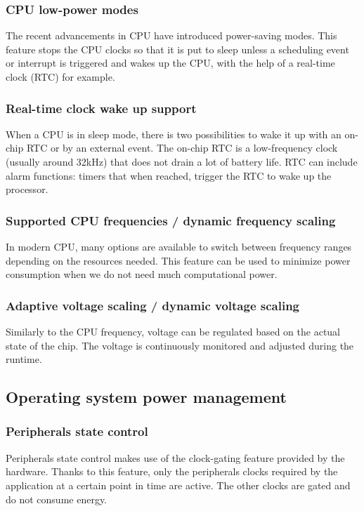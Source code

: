 \subsubsection{CPU low-power modes}
The recent advancements in CPU have introduced power-saving modes.
This feature stops the CPU clocks so that it is put to sleep unless
    a scheduling event or interrupt is triggered and wakes up the CPU, with the help of a real-time clock (RTC) for example.

\subsubsection{Real-time clock wake up support}
When a CPU is in sleep mode, there is two possibilities to wake it up with an on-chip RTC or by an external event.
The on-chip RTC is a low-frequency clock (usually around 32kHz) that does not drain a lot of battery life.
RTC can include alarm functions: timers that when reached, trigger the RTC to wake up the processor.

\subsubsection{Supported CPU frequencies / dynamic frequency scaling}
In modern CPU, many options are available to switch between frequency ranges depending on the resources needed.
This feature can be used to minimize power consumption when  we do not need much computational power.

\subsubsection{Adaptive voltage scaling / dynamic voltage scaling}
Similarly to the CPU frequency, voltage can be regulated based on the actual state of the chip.
The voltage is continuously monitored and adjusted during the runtime.


\subsection{Operating system power management}

\subsubsection{Peripherals state control}
Peripherals state control makes use of the clock-gating feature provided by the hardware.
Thanks to this feature, only the peripherals clocks required by the application at a certain point in time are active.
The other clocks are gated and do not consume energy.

